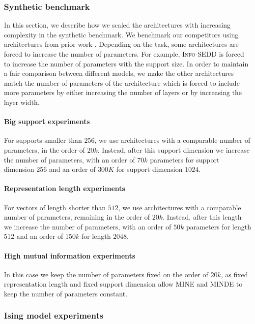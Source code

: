 \subsubsection{Synthetic benchmark} In this section, we describe how we scaled the architectures with increasing complexity in the synthetic benchmark.
We benchmark our competitors using architectures from prior work \citep{franzese2023minde, belghazi2018mine}. Depending on the task, some architectures are forced to increase the number of parameters. For example, \textsc{Info-SEDD} is forced to increase the number of parameters with the support size. In order to maintain a fair comparison between different models, we make the other architectures match the number of parameters of the architecture which is forced to include more parameters by either increasing the number of layers or by increasing the layer width.

\paragraph{Big support experiments} For supports smaller than $256$, we use architectures with a comparable number of parameters, in the order of $20k$. Instead, after this support dimension we increase the number of parameters, with an order of $70k$ parameters for support dimension $256$ and an order of $300K$ for support dimension $1024$.

\paragraph{Representation length experiments}For vectors of length shorter than $512$, we use architectures with a comparable number of parameters, remaining in the order of $20k$. Instead, after this length we increase the number of parameters, with an order of $50k$ parameters for length $512$ and an order of $150k$ for length $2048$.

\paragraph{High mutual information experiments} In this case we keep the number of parameters fixed on the order of $20k$, as fixed representation length and fixed support dimension allow MINE and MINDE to keep the number of parameters constant. 

\subsubsection{Ising model experiments}\label{subsec:app_ising} 

